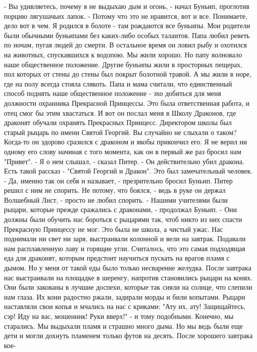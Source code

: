     - Вы удивляетесь, почему я не выдыхаю дым и огонь, - начал Буньип, 
проглотив порцию лягушачьих лапок. - Потому что это не нравится, вот и 
все.
    Понимаете, дело вот в чем. Я родился в болоте - там рождаются все 
буньипы. Мои родители были обычными буньипами без каких-либо особых 
талантов. Папа любил реветь по ночам, пугая людей до смерти. В 
остальное время он ловил рыбу и охотился на животных, спускавшихся к 
водопою. Мы жили хорошо. Но папу волновало наше общественное 
положение. Другие буньипы жили в просторных пещерах, пол которых от 
стены до стены был покрыт болотной травой. А мы жили в норе, где на 
полу всегда стояла слякоть. Папа и мама считали, что единственный 
способ поднять наше общественное положение - эхо добиться для меня 
должности охранника Прекрасной Принцессы. Это была ответственная 
работа, и отец смог бы этим хвастаться.
    И вот он послал меня в Школу Драконов, где драконят обучали 
охранять Прекрасных Принцесс. Директором школы был старый рыцарь по 
имени Святой Георгий. Вы случайно не слыхали о таком? Когда-то он 
здорово сразился с драконом и якобы прикончил его. Я не верил ни 
одному его слову начиная с того момента, как он в первый же раз бросил 
нам "Привет".
    - Я о нем слышал, - сказал Питер. - Он действительно убил дракона. 
Есть такой рассказ - "Святой Георгий и Дракон". Это был замечательный 
человек.
    - Да, именно так он себя и называет, - презрительно бросил Буньип.
    Питер решил с ним не спорить. Не потому, что боялся, - ведь в руке 
он держал Волшебный Лист, - просто не любил спорить.
    - Нашими учителями были рыцари, которые прежде сражались с 
драконами, - продолжал Буньип. - Они должны были обучить нас бороться 
с рыцарями так, чтоб никто из них спасти Прекрасную Принцессу не мог.
    Это была не школа, а чистый ужас. Нас поднимали ни свет ни заря, 
выстраивали колонной и вели на завтрак. Подавали нам расплавленную 
лаву и горящие угли. Считалось, что это самая подходящая еда для 
драконят, которым предстоит научиться пускать на врагов пламя с дымом. 
Но у меня от такой еды было только несварение желудка.
    После завтрака нас выстраивали на площадке в шеренгу, напротив 
становились рыцари на конях. Они были закованы в лучшие доспехи, 
которые так сияли на солнце, что слепили нам глаза. Их кони радостно 
ржали, задирали морды и били копытами. Рыцари наставляли свои копья и 
мчались на нас с криками: "Ату их, ату! Защищайтесь, сэр! Иду на вас, 
мошенник! Руки вверх!" - и тому подобными. Конечно, мы старались. Мы 
выдыхали пламя и страшно много дыма. Но мы ведь были еще дети и могли 
дохнуть пламенем только футов на десять. После хорошего завтрака кое-
